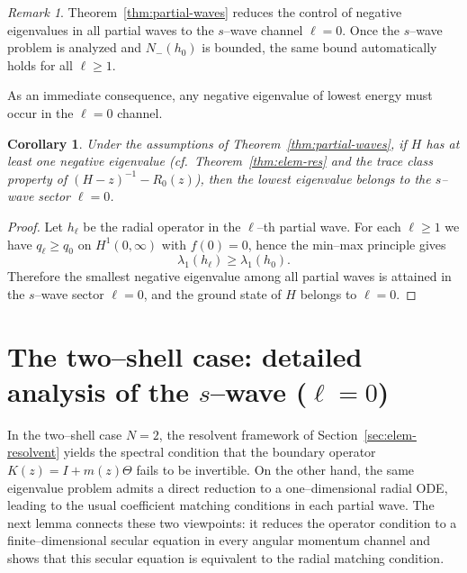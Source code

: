 \documentclass[a4paper,11pt]{article}
\numberwithin{equation}{section}
\newtheorem{cor}[thm]{Corollary}
\theoremstyle{definition}
\theoremstyle{remark}
\newtheorem{rem}{Remark}
\begin{document}
\begin{rem}\label{rem:two-bound-states-reduction}
Theorem~\ref{thm:partial-waves} reduces the control of negative eigenvalues in
all partial waves to the $s$--wave channel $\ell=0$.
Once the $s$--wave problem is analyzed and $N_-(h_0)$ is bounded, the same
bound automatically holds for all $\ell\ge1$.
\end{rem}

As an immediate consequence, any negative eigenvalue of lowest energy must
occur in the $\ell=0$ channel.

\begin{cor}\label{cor:groundstate-swave}
Under the assumptions of Theorem~\ref{thm:partial-waves}, if $H$ has at least
one negative eigenvalue (cf.\ Theorem~\ref{thm:elem-res} and the trace class
property of $(H-z)^{-1}-R_0(z)$), then the lowest eigenvalue belongs to the
$s$--wave sector $\ell=0$.
\end{cor}


\begin{proof}
Let $h_\ell$ be the radial operator in the $\ell$--th partial wave.
For each $\ell\ge1$ we have $q_\ell\ge q_0$ on $H^1(0,\infty)$ with $f(0)=0$,
hence the min--max principle gives
$$
\lambda_1(h_\ell)\ge \lambda_1(h_0).
$$
Therefore the smallest negative eigenvalue among all partial waves is attained
in the $s$--wave sector $\ell=0$, and the ground state of $H$ belongs to
$\ell=0$.
\end{proof}



\section{The two--shell case: detailed analysis of the $s$--wave ($\ell=0$)}\label{sec:Eigenval}

In the two--shell case $N=2$, the resolvent framework of
Section~\ref{sec:elem-resolvent} yields the spectral condition that the boundary
operator $K(z)=I+m(z)\Theta$ fails to be invertible.
On the other hand, the same eigenvalue problem admits a direct reduction to a
one--dimensional radial ODE, leading to the usual coefficient matching
conditions in each partial wave.
The next lemma connects these two viewpoints: it reduces the operator condition
to a finite--dimensional secular equation in every angular momentum channel and
shows that this secular equation is equivalent to the radial matching
condition.
\end{document}
